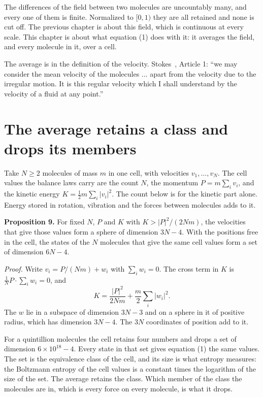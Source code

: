 The differences of the field between two molecules are uncountably many, and every one of them is
finite. Normalized to $[0,1)$ they are all retained and none is cut off. The previous chapter is about
this field, which is continuous at every scale. This chapter is about what equation (1) does with
it: it averages the field, and every molecule in it, over a cell.

The average is in the definition of the velocity. Stokes~\cite{src:Stokes-1845}, Article 1: ``we
may consider the mean velocity of the molecules ... apart
from the velocity due to the irregular motion. It is this regular velocity which I shall understand
by the velocity of a fluid at any point.''

\section{The average retains a class and drops its members}

Take $N \ge 2$ molecules of mass $m$ in one cell, with velocities $v_1,\dots,v_N$. The cell values the
balance laws carry are the count $N$, the momentum $P = m\sum_i v_i$, and the kinetic energy
$K = \tfrac12 m\sum_i |v_i|^2$. The count below is for the kinetic part alone. Energy stored in
rotation, vibration and the forces between molecules adds to it.

\textbf{Proposition 9.} For fixed $N$, $P$ and $K$ with $K > |P|^2/(2Nm)$, the velocities that give
those values form a sphere of dimension $3N-4$. With the positions free in the cell, the states of
the $N$ molecules that give the same cell values form a set of dimension $6N-4$.

\emph{Proof.} Write $v_i = P/(Nm) + w_i$ with $\sum_i w_i = 0$. The cross term in $K$ is
$\tfrac{1}{N}P\cdot\sum_i w_i = 0$, and
\[
K = \frac{|P|^2}{2Nm} + \frac{m}{2}\sum_i |w_i|^2 .
\]
The $w$ lie in a subspace of dimension $3N-3$ and on a sphere in it of positive radius, which has
dimension $3N-4$. The $3N$ coordinates of position add to it. \hfill\qedsymbol

For a quintillion molecules the cell retains four numbers and drops a set of dimension
$6\times 10^{18} - 4$. Every state in that set gives equation (1) the same values. The set is the
equivalence class of the cell, and its size is what entropy measures: the Boltzmann entropy of the
cell values is a constant times the logarithm of the size of the set. The average retains the class.
Which member of the class the molecules are in, which is every force on every molecule, is what it
drops.

